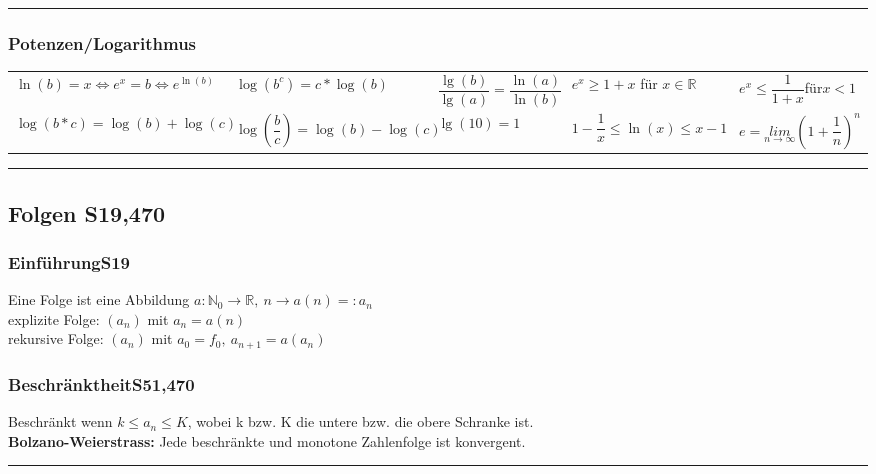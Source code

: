\documentclass[6pt,a4paper]{scrartcl}
\begin{document}
\begin{multicols*}{2}
\hrule


\subsubsection{Potenzen/Logarithmus}
\begin{tabular}{lll|ll}
$\ln(b)=x\Leftrightarrow e^{x}=b\Leftrightarrow e^{\ln(b)} $ & $\log(b^{c})=c*\log(b)$ & $\dfrac{\lg(b)}{\lg(a)}=\dfrac{\ln(a)}{\ln(b)}$ & $e^{x}\geq 1+x$ für $x\in \mathbb{R}$ & $e^{x}\leq \dfrac{1}{1+x}$für$x<1$\\
$\log(b*c)=\log(b)+\log(c) $ & $\log(\dfrac{b}{c})=\log(b)-\log(c)$  & $\lg(10)=1$ &  $1-\dfrac{1}{x}\leq \ln (x)\leq x-1$&$e=\underset{n\rightarrow \infty}{lim}(1+\dfrac{1}{n})^{n}$ \\
\end{tabular}
\vspace{1mm}
\hrule

\subsection{Folgen \color{red} S19,470}
\subsubsection{Einführung\color{red}S19}
Eine Folge ist eine Abbildung $a: \mathbb N_0 \rightarrow \mathbb R,\ n \rightarrow a(n) =: a_n$\\
explizite Folge: $(a_n)$ mit $a_n=a(n)$\\ 
rekursive Folge: $(a_n)$ mit $a_0=f_0,\  a_{n+1}=a(a_n)$\\

\begin{multicols}{2}
\subsubsection{Beschränktheit\color{red}S51,470}
Beschränkt wenn $k\leq a_{n}\leq K$, wobei k bzw. K die untere bzw. die obere Schranke ist.\\
\textbf{Bolzano-Weierstrass:} Jede beschränkte und monotone Zahlenfolge ist konvergent.
\hrule

\end{multicols}
\end{multicols*}
\end{document}
